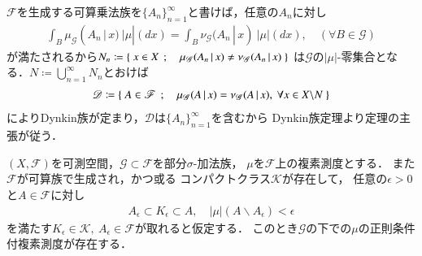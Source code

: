 	\begin{prf}
		$\mathscr{F}$を生成する可算乗法族を$\{A_n\}_{n=1}^\infty$と書けば，任意の$A_n$に対し
		\begin{align}
			\int_{B} \mu_{\mathscr{G}}(A_n\, |\, x)\ |\mu|(dx)
			= \int_{B} \nu_{\mathscr{G}}(A_n\, |\, x)\ |\mu|(dx),
			\quad (\forall B \in \mathscr{G})
		\end{align}
		が満たされるから$N_n \coloneqq \left\{\ x \in X\ \, ; \quad \mu_{\mathscr{G}}(A_n\, |\, x) \neq \nu_{\mathscr{G}}(A_n\, |\, x)\ \right\}$
		は$\mathscr{G}$の$|\mu|$-零集合となる．$N \coloneqq \bigcup_{n=1}^\infty N_n$とおけば
		\begin{align}
			\mathscr{D} \coloneqq \Set{A \in \mathscr{F}}{\mu_{\mathscr{G}}(A\, |\, x) = \nu_{\mathscr{G}}(A\, |\, x),\ 
			\forall x \in X \backslash N}
		\end{align}
		によりDynkin族が定まり，$\mathscr{D}$は$\{A_n\}_{n=1}^\infty$を含むから
		Dynkin族定理より定理の主張が従う．
		\QED
	\end{prf}
	
	\begin{screen}
		\begin{thm}[正則条件付測度の存在]
			$(X,\mathscr{F})$を可測空間，$\mathscr{G} \subset \mathscr{F}$を部分$\sigma$-加法族，
			$\mu$を$\mathscr{F}$上の複素測度とする．
			また$\mathscr{F}$が可算族で生成され，かつ或る
			コンパクトクラス$\mathcal{K}$が存在して，
			任意の$\epsilon > 0$と$A \in \mathscr{F}$に対し
			\begin{align}
				A_\epsilon \subset K_\epsilon \subset A,\quad |\mu|(A \backslash A_\epsilon) < \epsilon
			\end{align}
			を満たす$K_\epsilon \in \mathcal{K},\ A_\epsilon \in \mathscr{F}$が取れると仮定する．
			このとき$\mathscr{G}$の下での$\mu$の正則条件付複素測度が存在する．
		\end{thm}
	\end{screen}